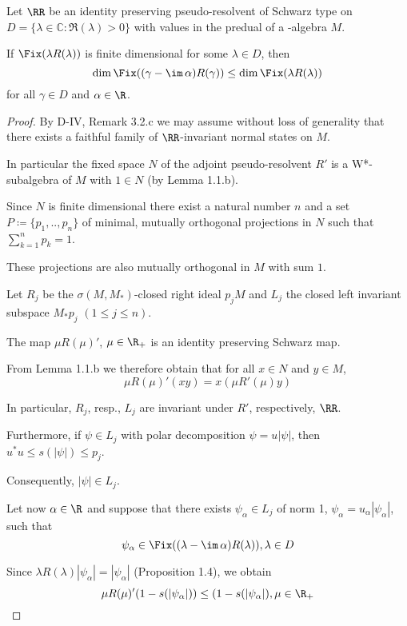 \begin{proposition}\label{prop:d3-2.1}
Let $\RR$ be an identity preserving pseudo-resolvent of Schwarz type on $D = \{\lambda \in \mathbb{C} \colon \Re(\lambda) > 0\}$ with values in the predual of a \WA-algebra $M$.

If $\Fix(\lambda R(\lambda))$ is finite dimensional for some $\lambda \in D$, then
\[
\dim \Fix((\gamma - \im\,\alpha)R(\gamma)) \leq \dim \Fix(\lambda R(\lambda))
\]
for all $\gamma \in D$ and $\alpha \in \R$.
\end{proposition}

\begin{proof}
By D-IV, Remark 3.2.c we may assume without loss of generality that there exists a faithful family of $\RR$-invariant normal states on $M$.

In particular the fixed space $N$ of the adjoint pseudo-resolvent $R'$ is a W*-subalgebra of $M$ with $1 \in N$ (by Lemma 1.1.b).

Since $N$ is finite dimensional there exist a natural number $n$ and a set $P \coloneqq \{p_{1}, .., p_{n}\}$ of minimal, mutually orthogonal projections in $N$ such that $\sum_{k=1}^{n} p_{k} = 1$.

These projections are also mutually orthogonal in $M$ with sum $1$.

Let $R_{j}$ be the $\sigma(M,M_{*})$-closed right ideal $p_{j}M$ and $L_{j}$ the closed left invariant subspace $M_{*}p_{j}$ $(1 \leq j \leq n)$.

The map $\mu R(\mu)'$, $\mu \in \R_{+}$ is an identity preserving Schwarz map.

From Lemma 1.1.b we therefore obtain that for all $x \in N$ and $y \in M$,
\[
\mu R(\mu)'(xy) = x(\mu R'(\mu)y)
\]

In particular, $R_{j}$, resp., $L_{j}$ are invariant under $R'$, respectively, $\RR$.

Furthermore, if $\psi \in L_{j}$ with polar decomposition $\psi = u|\psi|$, then $u^{*}u \leq s(|\psi|) \leq p_{j}$.

Consequently, $|\psi| \in L_{j}$.

Let now $\alpha \in \R$ and suppose that there exists $\psi_{\alpha} \in L_{j}$ of norm 1, $\psi_{\alpha} = u_{\alpha}|\psi_{\alpha}|$, such that
\[
\psi_{\alpha} \in \Fix((\lambda - \im\,\alpha)R(\lambda)) , \lambda \in D
\]

Since $\lambda R(\lambda)|\psi_{\alpha}| = |\psi_{\alpha}|$ (Proposition 1.4), we obtain
\[
\mu R(\mu)'(1-s(|\psi_{\alpha}|)) \leq (1-s(|\psi_{\alpha}|) , \mu \in \R_{+}
\]


\end{proof}
